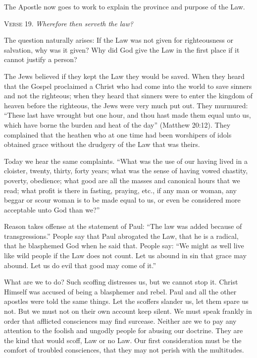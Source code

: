 The Apostle now goes to work to explain the province and purpose of the Law.

\textsc{Verse} 19. \emph{Wherefore then serveth the law?}

The question naturally arises: If the Law was not given for righteousness or salvation, why was it given? Why did God give the Law in the first place if it cannot justify a person?

The Jews believed if they kept the Law they would be saved. When they heard that the Gospel proclaimed a Christ who had come into the world to save sinners and not the righteous; when they heard that sinners were to enter the kingdom of heaven before the righteous, the Jews were very much put out. They murmured: “These last have wrought but one hour, and thou hast made them equal unto us, which have borne the burden and heat of the day” (Matthew 20:12). They complained that the heathen who at one time had been worshipers of idols obtained grace without the drudgery of the Law that was theirs.

Today we hear the same complaints. “What was the use of our having lived in a cloister, twenty, thirty, forty years; what was the sense of having vowed chastity, poverty, obedience; what good are all the masses and canonical hours that we read; what profit is there in fasting, praying, etc., if any man or woman, any beggar or scour woman is to be made equal to us, or even be considered more acceptable unto God than we?”

Reason takes offense at the statement of Paul: “The law was added because of transgressions.” People say that Paul abrogated the Law, that he is a radical, that he blasphemed God when he said that. People say: “We might as well live like wild people if the Law does not count. Let us abound in sin that grace may abound. Let us do evil that good may come of it.”

What are we to do? Such scoffing distresses us, but we cannot stop it. Christ Himself was accused of being a blasphemer and rebel. Paul and all the other apostles were told the same things. Let the scoffers slander us, let them spare us not. But we must not on their own account keep silent. We must speak frankly in order that afflicted consciences may find surcease. Neither are we to pay any attention to the foolish and ungodly people for abusing our doctrine. They are the kind that would scoff, Law or no Law. Our first consideration must be the comfort of troubled consciences, that they may not perish with the multitudes.

